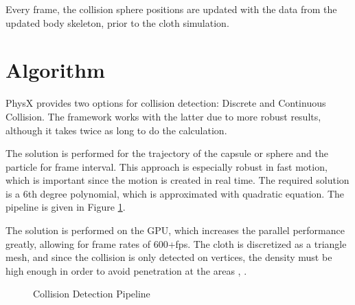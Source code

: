 Every frame, the collision sphere positions are updated with the data from the updated body skeleton, prior to the cloth simulation. 

\section{Algorithm}

PhysX provides two options for collision detection: Discrete and Continuous Collision. The framework works with the latter due to more robust results, although it takes twice
 as long to do the calculation.

The solution is performed for the trajectory of the capsule or sphere and the particle for frame interval. This approach is especially robust in fast motion, which is important
 since the motion is created in real time. The required solution is a 6th degree polynomial, which is approximated with quadratic equation. The pipeline is given in Figure
  \ref{fig:collision_pipeline}.

The solution is performed on the GPU, which increases the parallel performance greatly, allowing for frame rates of 600+fps. The cloth is discretized as a triangle mesh,
 and since the collision is only detected on vertices, the density must be high enough in order to avoid penetration at the areas \cite{Kim2011}, \cite{Tonge2010}. 

\begin{figure}[h]
\centerline{}
\caption{Collision Detection Pipeline \cite{Tonge2010} }
\label{fig:collision_pipeline}
\end{figure}